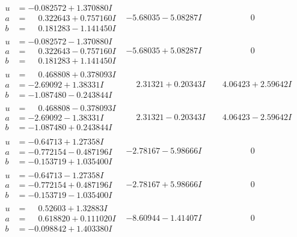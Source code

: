 \documentclass[1p]{elsarticle_modified}
\theoremstyle{definition}
\begin{document}
$$\begin{array}{c|c|c}
\begin{aligned}
u &= -0.082572 + 1.370880 I \\
a &= \phantom{-}0.322643 + 0.757160 I \\
b &= \phantom{-}0.181283 - 1.141450 I\end{aligned}
 & -5.68035 - 5.08287 I & \phantom{-0.000000 } 0 \\ \hline\begin{aligned}
u &= -0.082572 - 1.370880 I \\
a &= \phantom{-}0.322643 - 0.757160 I \\
b &= \phantom{-}0.181283 + 1.141450 I\end{aligned}
 & -5.68035 + 5.08287 I & \phantom{-0.000000 } 0 \\ \hline\begin{aligned}
u &= \phantom{-}0.468808 + 0.378093 I \\
a &= -2.69092 + 1.38331 I \\
b &= -1.087480 - 0.243844 I\end{aligned}
 & \phantom{-}2.31321 + 0.20343 I & \phantom{-}4.06423 + 2.59642 I \\ \hline\begin{aligned}
u &= \phantom{-}0.468808 - 0.378093 I \\
a &= -2.69092 - 1.38331 I \\
b &= -1.087480 + 0.243844 I\end{aligned}
 & \phantom{-}2.31321 - 0.20343 I & \phantom{-}4.06423 - 2.59642 I \\ \hline\begin{aligned}
u &= -0.64713 + 1.27358 I \\
a &= -0.772154 - 0.487196 I \\
b &= -0.153719 + 1.035400 I\end{aligned}
 & -2.78167 - 5.98666 I & \phantom{-0.000000 } 0 \\ \hline\begin{aligned}
u &= -0.64713 - 1.27358 I \\
a &= -0.772154 + 0.487196 I \\
b &= -0.153719 - 1.035400 I\end{aligned}
 & -2.78167 + 5.98666 I & \phantom{-0.000000 } 0 \\ \hline\begin{aligned}
u &= \phantom{-}0.52603 + 1.32883 I \\
a &= \phantom{-}0.618820 + 0.111020 I \\
b &= -0.098842 + 1.403380 I\end{aligned}
 & -8.60944 - 1.41407 I & \phantom{-0.000000 } 0 \\ \hline\begin{aligned}

\end{aligned}
\end{array}$$
\end{document}
